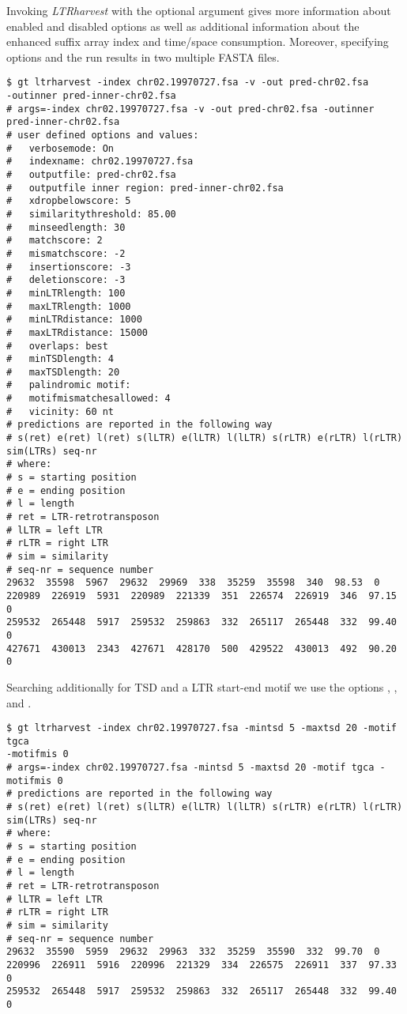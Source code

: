 \documentclass[12pt,titlepage]{article}
\newcommand{\LTRharvest}{\textit{LTRharvest}\xspace}
\begin{document}
Invoking \LTRharvest with the optional argument  gives
more information about enabled and disabled options as well as
additional information about the enhanced suffix array index
and time/space consumption. Moreover, specifying options 
and  the run results in two multiple FASTA files.

\begin{footnotesize}
\begin{verbatim}
$ gt ltrharvest -index chr02.19970727.fsa -v -out pred-chr02.fsa
-outinner pred-inner-chr02.fsa
# args=-index chr02.19970727.fsa -v -out pred-chr02.fsa -outinner pred-inner-chr02.fsa
# user defined options and values:
#   verbosemode: On
#   indexname: chr02.19970727.fsa
#   outputfile: pred-chr02.fsa
#   outputfile inner region: pred-inner-chr02.fsa
#   xdropbelowscore: 5
#   similaritythreshold: 85.00
#   minseedlength: 30
#   matchscore: 2
#   mismatchscore: -2
#   insertionscore: -3
#   deletionscore: -3
#   minLTRlength: 100
#   maxLTRlength: 1000
#   minLTRdistance: 1000
#   maxLTRdistance: 15000
#   overlaps: best
#   minTSDlength: 4
#   maxTSDlength: 20
#   palindromic motif:
#   motifmismatchesallowed: 4
#   vicinity: 60 nt
# predictions are reported in the following way
# s(ret) e(ret) l(ret) s(lLTR) e(lLTR) l(lLTR) s(rLTR) e(rLTR) l(rLTR) sim(LTRs) seq-nr
# where:
# s = starting position
# e = ending position
# l = length
# ret = LTR-retrotransposon
# lLTR = left LTR
# rLTR = right LTR
# sim = similarity
# seq-nr = sequence number
29632  35598  5967  29632  29969  338  35259  35598  340  98.53  0
220989  226919  5931  220989  221339  351  226574  226919  346  97.15  0
259532  265448  5917  259532  259863  332  265117  265448  332  99.40  0
427671  430013  2343  427671  428170  500  429522  430013  492  90.20  0

\end{verbatim}
\end{footnotesize}

Searching additionally for TSD and a LTR start-end motif we use
the options , ,  and
.

\begin{footnotesize}
\begin{verbatim}
$ gt ltrharvest -index chr02.19970727.fsa -mintsd 5 -maxtsd 20 -motif tgca
-motifmis 0
# args=-index chr02.19970727.fsa -mintsd 5 -maxtsd 20 -motif tgca -motifmis 0
# predictions are reported in the following way
# s(ret) e(ret) l(ret) s(lLTR) e(lLTR) l(lLTR) s(rLTR) e(rLTR) l(rLTR) sim(LTRs) seq-nr
# where:
# s = starting position
# e = ending position
# l = length
# ret = LTR-retrotransposon
# lLTR = left LTR
# rLTR = right LTR
# sim = similarity
# seq-nr = sequence number
29632  35590  5959  29632  29963  332  35259  35590  332  99.70  0
220996  226911  5916  220996  221329  334  226575  226911  337  97.33  0
259532  265448  5917  259532  259863  332  265117  265448  332  99.40  0
\end{verbatim}
\end{footnotesize}
\end{document}
